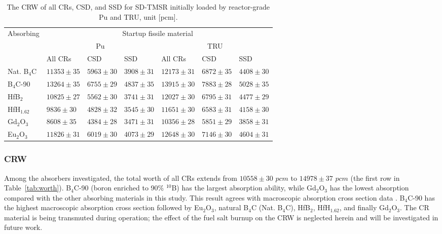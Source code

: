 \begin{table} %
	\caption{The CRW of all CRs, CSD, and SSD for SD-TMSR initially loaded by reactor-grade Pu and TRU, unit [pcm].}
	\begin{tabularx}{\textwidth}{ p{2cm} | X X X   X X X } \hline
		\multirow{1}{*}{Absorbing}
		 \multirow{1}{*}{materials}
		 		& 
		\multicolumn{6}{c}{Startup fissile material} \\ \cline{2-7}
		\space   & \multicolumn{3}{c}{Pu} & 
		\multicolumn{3}{c}{TRU} \\ \cline{2-7}
		\space  & All CRs & CSD & SSD & All CRs & CSD & 
		SSD \\ \hline
		Nat. B$_4$C 
		&$11353\pm35$&$5963\pm30$&$3908\pm31$&$12173\pm31$&$6872\pm35$ &$4408\pm30$
		\\ 
		B$_4$C-90 
		&$13264\pm35$&$6755\pm29$&$4837\pm35$&$13915\pm30$&$7883\pm28$&$5028\pm35$ \\
		HfB$_2$ 
		&$10825\pm27$&$5562\pm30$&$3741\pm31$&$12027\pm30$&$6795\pm31$&$4477\pm29$ \\ 
	    HfH$_{1.62}$
		&$9836\pm30$&$4828\pm32$&$3545\pm30$&$11651\pm30$&$6583\pm31$&$4158\pm30$ \\ 
		Gd$_2$O$_3$ 
		&$8608\pm35$&$4384\pm28$&$3471\pm31$&$10356\pm28$&$5851\pm29$&$3858\pm31$ \\ 
		Eu$_2$O$_3$ 
		&$11826\pm31$&$6019\pm30$&$4073\pm29$&$12648\pm30$&$7146\pm30$&$4604\pm31$ \\ 
		\hline
	\end{tabularx}
	\label{tab:table51}
\end{table}

\subsubsection{CRW} \label{CR_worth}

Among the absorbers investigated, the total worth of all CRs extends from $10558\pm30$ $pcm$ to $14978\pm37$ 
$pcm$ (the first row in Table~\ref{tab:worth}). B$_4$C-90 (boron enriched to 90\% $^{10}$B)
has the largest absorption ability, while Gd$_2$O$_3$ has the lowest 
absorption compared with the other absorbing materials in this study. This 
result agrees with macroscopic absorption cross section data 
\cite{guo2019optimized}. B$_4$C-90 has the highest macroscopic 
absorption cross section followed by Eu$_2$O$_3$, natural B$_4$C (Nat. B$_4$C), HfB$_2$, HfH$_{1.62}$, and 
finally Gd$_2$O$_3$. The CR material is being transmuted during 
operation; the effect of the fuel salt burnup on the CRW is neglected
herein and will be investigated in future work.

